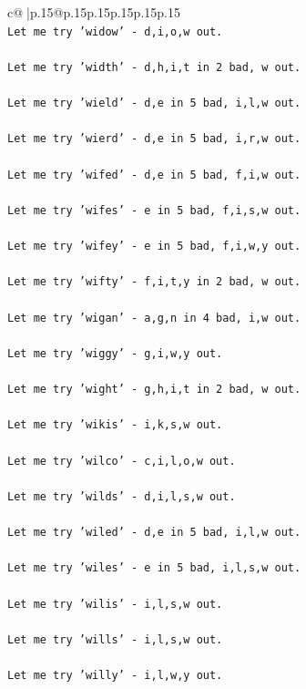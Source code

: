 \documentclass{article}
\begin{document}
{\begin{supertabular}{c@{$\;$}|p{.15\linewidth}@{}p{.15\linewidth}p{.15\linewidth}p{.15\linewidth}p{.15\linewidth}p{.15\linewidth}}
{{{\\ 
\texttt{Let me try 'widow' {-} d,i,o,w out. } \\
\\ 
\texttt{Let me try 'width' {-} d,h,i,t in 2 bad, w out. } \\
\\ 
\texttt{Let me try 'wield' {-} d,e in 5 bad, i,l,w out. } \\
\\ 
\texttt{Let me try 'wierd' {-} d,e in 5 bad, i,r,w out. } \\
\\ 
\texttt{Let me try 'wifed' {-} d,e in 5 bad, f,i,w out. } \\
\\ 
\texttt{Let me try 'wifes' {-} e in 5 bad, f,i,s,w out. } \\
\\ 
\texttt{Let me try 'wifey' {-} e in 5 bad, f,i,w,y out. } \\
\\ 
\texttt{Let me try 'wifty' {-} f,i,t,y in 2 bad, w out. } \\
\\ 
\texttt{Let me try 'wigan' {-} a,g,n in 4 bad, i,w out. } \\
\\ 
\texttt{Let me try 'wiggy' {-} g,i,w,y out. } \\
\\ 
\texttt{Let me try 'wight' {-} g,h,i,t in 2 bad, w out. } \\
\\ 
\texttt{Let me try 'wikis' {-} i,k,s,w out. } \\
\\ 
\texttt{Let me try 'wilco' {-} c,i,l,o,w out. } \\
\\ 
\texttt{Let me try 'wilds' {-} d,i,l,s,w out. } \\
\\ 
\texttt{Let me try 'wiled' {-} d,e in 5 bad, i,l,w out. } \\
\\ 
\texttt{Let me try 'wiles' {-} e in 5 bad, i,l,s,w out. } \\
\\ 
\texttt{Let me try 'wilis' {-} i,l,s,w out. } \\
\\ 
\texttt{Let me try 'wills' {-} i,l,s,w out. } \\
\\ 
\texttt{Let me try 'willy' {-} i,l,w,y out. } \\
}}}
\end{supertabular}}
\end{document}
